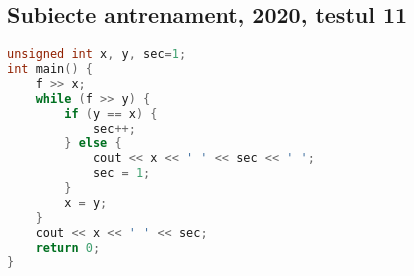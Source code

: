 \documentclass[10pt, a4paper, twocolumn]{article}
\begin{document}
\subsection*{Subiecte antrenament, 2020, testul 11}
\begin{lstlisting}[language=C++]
unsigned int x, y, sec=1;
int main() {
    f >> x;
    while (f >> y) {
        if (y == x) {
            sec++;
        } else {
            cout << x << ' ' << sec << ' ';
            sec = 1;
        }
        x = y;
    }
    cout << x << ' ' << sec;
    return 0;
}
\end{lstlisting}
\end{document}
